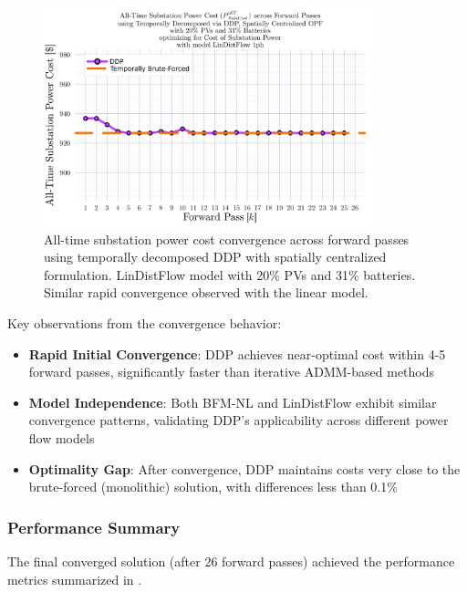 \begin{figure}[h]
    \centering
    \includegraphics[width=0.85\textwidth]{figures/SubstationPowerCostAllTime_vs_k_26_for_subsPowerCost_min_with_scd_alpha_3_033_gamma_0_0_via_tmprl_dcmpsd_spat_centr_system_with_ldf_1ph.png}
    \caption{All-time substation power cost convergence across forward passes using temporally decomposed DDP with spatially centralized formulation. LinDistFlow model with 20\% PVs and 31\% batteries. Similar rapid convergence observed with the linear model.}
    \label{fig:ddp-convergence-ldf}
\end{figure}

Key observations from the convergence behavior:
\begin{itemize}
    \item \textbf{Rapid Initial Convergence}: DDP achieves near-optimal cost within 4-5 forward passes, significantly faster than iterative ADMM-based methods
    \item \textbf{Model Independence}: Both BFM-NL and LinDistFlow exhibit similar convergence patterns, validating DDP's applicability across different power flow models
    \item \textbf{Optimality Gap}: After convergence, DDP maintains costs very close to the brute-forced (monolithic) solution, with differences less than 0.1\%
\end{itemize}

\subsubsection{Performance Summary}

The final converged solution (after 26 forward passes) achieved the performance metrics summarized in .

